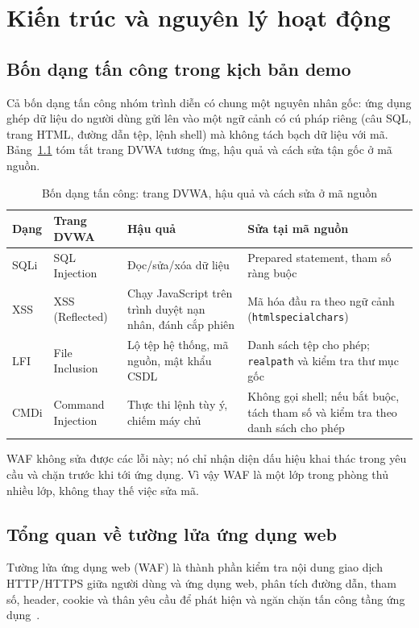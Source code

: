\chapter{Kiến trúc và nguyên lý hoạt động}\label{chap:kientruc}

\section{Bốn dạng tấn công trong kịch bản demo}\label{sec:tancong}
Cả bốn dạng tấn công nhóm trình diễn có chung một nguyên nhân gốc: ứng dụng ghép dữ liệu do người dùng gửi lên vào một ngữ cảnh có cú pháp riêng (câu SQL, trang HTML, đường dẫn tệp, lệnh shell) mà không tách bạch dữ liệu với mã. Bảng~\ref{tab:tancong} tóm tắt trang DVWA tương ứng, hậu quả và cách sửa tận gốc ở mã nguồn.

\begin{table}[!htb]
\centering
\caption{Bốn dạng tấn công: trang DVWA, hậu quả và cách sửa ở mã nguồn}
\label{tab:tancong}
\footnotesize
\begin{tabularx}{\linewidth}{@{}llXX@{}}
\toprule
\textbf{Dạng} & \textbf{Trang DVWA} & \textbf{Hậu quả} & \textbf{Sửa tại mã nguồn} \\ \midrule
SQLi & SQL Injection & Đọc/sửa/xóa dữ liệu & Prepared statement, tham số ràng buộc \\
XSS & XSS (Reflected) & Chạy JavaScript trên trình duyệt nạn nhân, đánh cắp phiên & Mã hóa đầu ra theo ngữ cảnh (\texttt{htmlspecialchars}) \\
LFI & File Inclusion & Lộ tệp hệ thống, mã nguồn, mật khẩu CSDL & Danh sách tệp cho phép; \texttt{realpath} và kiểm tra thư mục gốc \\
CMDi & Command Injection & Thực thi lệnh tùy ý, chiếm máy chủ & Không gọi shell; nếu bắt buộc, tách tham số và kiểm tra theo danh sách cho phép \\
\bottomrule
\end{tabularx}
\end{table}

WAF không sửa được các lỗi này; nó chỉ nhận diện dấu hiệu khai thác trong yêu cầu và chặn trước khi tới ứng dụng. Vì vậy WAF là một lớp trong phòng thủ nhiều lớp, không thay thế việc sửa mã.

\section{Tổng quan về tường lửa ứng dụng web}
Tường lửa ứng dụng web (WAF) là thành phần kiểm tra nội dung giao dịch HTTP/HTTPS giữa người dùng và ứng dụng web, phân tích đường dẫn, tham số, header, cookie và thân yêu cầu để phát hiện và ngăn chặn tấn công tầng ứng dụng~\cite{owasptop10}.

